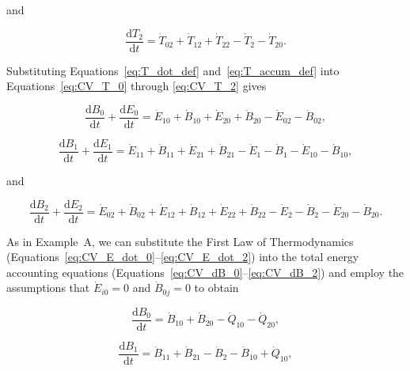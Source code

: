\noindent and

\begin{equation} \label{eq:CV_T_2}
	\frac{\mathrm{d}T_{2}}{\mathrm{d}t} 	 
	= \dot{T}_{02} 
	+ \dot{T}_{12}
	+ \dot{T}_{22} 
	- \dot{T}_{2} 
	- \dot{T}_{20}.
\end{equation}

Substituting Equations~\ref{eq:T_dot_def} 
and~\ref{eq:T_accum_def} into 
Equations~\ref{eq:CV_T_0} through
\ref{eq:CV_T_2} gives

\begin{equation} \label{eq:CV_dB_0}
	\frac{\mathrm{d}B_{0}}{\mathrm{d}t} 
	+ \frac{\mathrm{d}E_{0}}{\mathrm{d}t} 
	= \dot{E}_{10} 
	+ \dot{B}_{10} 
	+ \dot{E}_{20} 
	+ \dot{B}_{20} 
	- \dot{E}_{02} 
	- \dot{B}_{02},
\end{equation}

\begin{equation} \label{eq:CV_dB_1}
	\frac{\mathrm{d}B_{1}}{\mathrm{d}t} 
	+ \frac{\mathrm{d}E_{1}}{\mathrm{d}t} 
	= \dot{E}_{11}
	+ \dot{B}_{11}
	+ \dot{E}_{21} 
	+ \dot{B}_{21} 
	- \dot{E}_1
	- \dot{B}_1
	- \dot{E}_{10} 
	- \dot{B}_{10},
\end{equation}

\noindent and 

\begin{equation} \label{eq:CV_dB_2}
	\frac{\mathrm{d}B_{2}}{\mathrm{d}t} 
	+ \frac{\mathrm{d}E_{2}}{\mathrm{d}t} 
	= \dot{E}_{02} 
	+ \dot{B}_{02} 
	+ \dot{E}_{12}
	+ \dot{B}_{12}
	+ \dot{E}_{22} 
	+ \dot{B}_{22} 
	- \dot{E}_{2} 
	- \dot{B}_{2} 
	- \dot{E}_{20} 
	- \dot{B}_{20}.
\end{equation}

As in Example~A, we can substitute the First Law of Thermodynamics 
(Equations~\ref{eq:CV_E_dot_0}--\ref{eq:CV_E_dot_2})
into the total energy accounting equations
(Equations~\ref{eq:CV_dB_0}--\ref{eq:CV_dB_2}) 
and employ the assumptions that 
$\dot{E}_{i0} = 0$ and
$\dot{B}_{0j} = 0$ 
to obtain

\begin{equation} \label{eq:B_embodied_energy_accounting_0}
	\frac{\mathrm{d}B_{0}}{\mathrm{d}t} 
	= \dot{B}_{10} 
	+ \dot{B}_{20} 
	- \dot{Q}_{10} 
	- \dot{Q}_{20}, 
\end{equation}

\begin{equation} \label{eq:B_embodied_energy_accounting_1}
	\frac{\mathrm{d}B_{1}}{\mathrm{d}t} 
	= \dot{B}_{11} 
	+ \dot{B}_{21}
	- \dot{B}_{2} 
	- \dot{B}_{10}
	+ \dot{Q}_{10},
\end{equation}

